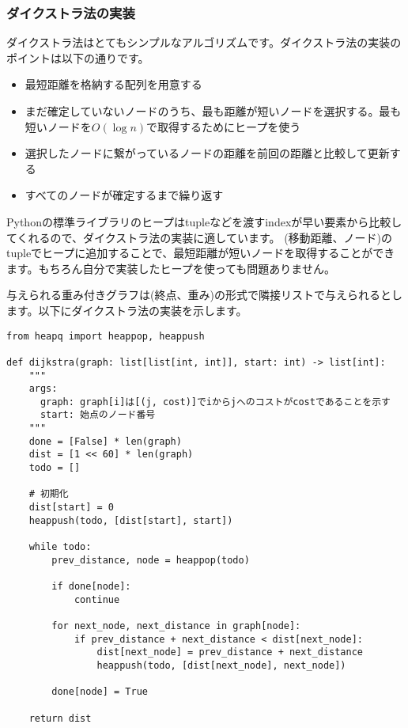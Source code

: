 \documentclass{jlreq}
\begin{document}
\vspace{0.5cm}

\subsubsection{ダイクストラ法の実装}
ダイクストラ法はとてもシンプルなアルゴリズムです。ダイクストラ法の実装のポイントは以下の通りです。

\begin{itemize}
  \item 最短距離を格納する配列を用意する
  \item まだ確定していないノードのうち、最も距離が短いノードを選択する。最も短いノードを$O(\log n)$で取得するためにヒープを使う
  \item 選択したノードに繋がっているノードの距離を前回の距離と比較して更新する
  \item すべてのノードが確定するまで繰り返す
\end{itemize}

Pythonの標準ライブラリのヒープはtupleなどを渡すindexが早い要素から比較してくれるので、ダイクストラ法の実装に適しています。
(移動距離、ノード)のtupleでヒープに追加することで、最短距離が短いノードを取得することができます。もちろん自分で実装したヒープを使っても問題ありません。

与えられる重み付きグラフは(終点、重み)の形式で隣接リストで与えられるとします。以下にダイクストラ法の実装を示します。
\begin{lstlisting}[caption=ダイクストラ法の実装, label=dijkstra, frame=TRBL, label={dijkstra}]
from heapq import heappop, heappush

def dijkstra(graph: list[list[int, int]], start: int) -> list[int]:
    """
    args:
      graph: graph[i]は[(j, cost)]でiからjへのコストがcostであることを示す
      start: 始点のノード番号
    """
    done = [False] * len(graph)
    dist = [1 << 60] * len(graph)
    todo = []
    
    # 初期化
    dist[start] = 0
    heappush(todo, [dist[start], start])
    
    while todo:
        prev_distance, node = heappop(todo)
        
        if done[node]:
            continue
        
        for next_node, next_distance in graph[node]:
            if prev_distance + next_distance < dist[next_node]:
                dist[next_node] = prev_distance + next_distance
                heappush(todo, [dist[next_node], next_node])
        
        done[node] = True 
    
    return dist
\end{lstlisting}
\end{document}
